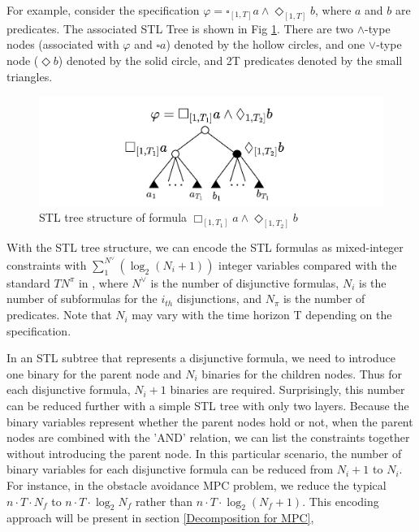 \documentclass[a4paper]{report}
\begin{document}
For example, consider the specification $\varphi = \square_{[1,T]}a \wedge \Diamond_{[1,T]}b$, where $a$ and $b$ are predicates. The associated STL Tree is shown in Fig \ref{STLtree_simple}. There are two $\wedge$-type nodes (associated with $\varphi$ and $\square a$) denoted by the hollow circles, and one $\vee$-type node ($\Diamond b$) denoted by the solid circle, and 2T predicates denoted by the small triangles.

\begin{figure}
    \vspace{0.5cm}
    \centering
    \includegraphics[scale=0.8]{STLtree_simple.png}
    \vspace{-0.4cm}
    \caption{STL tree structure of formula $\Box_{[1,T_1]}a\wedge \Diamond_{[1,T_2]}b$}
    \label{STLtree_simple}
    \vspace{-0.6cm}
\end{figure}

With the STL tree structure, we can encode the STL formulas as mixed-integer constraints with $\sum_{1}^{N^\lor}(\log_2(N_i+1))$ integer variables compared with the standard $TN^{\pi}$ in \cite[]{raman2014model}, where $N^\vee$ is the number of disjunctive formulas, $N_i$ is the number of subformulas for the $i_{th}$ disjunctions, and $N_{\pi}$ is the number of predicates. Note that $N_i$ may vary with the time horizon T depending on the specification. 

In an STL subtree that represents a disjunctive formula, we need to introduce one binary for the parent node and $N_i$ binaries for the children nodes. Thus for each disjunctive formula, $N_i+1$ binaries are required. Surprisingly, this number can be reduced further with a simple STL tree with only two layers. Because the binary variables represent whether the parent nodes hold or not, when the parent nodes are combined with the 'AND' relation, we can list the constraints together without introducing the parent node. In this particular scenario, the number of binary variables for each disjunctive formula can be reduced from $N_i+1$ to $N_i$. For instance, in the obstacle avoidance MPC problem, we reduce the typical $n\cdot T\cdot N_f$ to $n\cdot T\cdot \log_2N_f$ rather than $n\cdot T\cdot \log_2(N_f+1)$. This encoding approach will be present in section \ref*{Decomposition for MPC}, 
\end{document}
